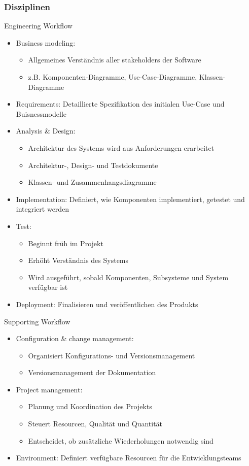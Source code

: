 \subsubsection{Disziplinen}
Engineering Workflow
\begin{itemize}
	\item Business modeling:
		\begin{itemize}
			\item Allgemeines Verständnis aller \glqq{}stakeholders\grqq{} der Software
			\item z.B. Komponenten-Diagramme, Use-Case-Diagramme, Klassen-Diagramme
		\end{itemize}
	\item Requirements: Detaillierte Spezifikation des initialen Use-Case und Buisnessmodelle
	\item Analysis \& Design:
		\begin{itemize}
			\item Architektur des Systems wird aus Anforderungen  erarbeitet
			\item Architektur-, Design- und Testdokumente
			\item Klassen- und Zusammenhangsdiagramme
		\end{itemize}
	\item Implementation: Definiert, wie Komponenten implementiert, getestet und integriert werden
	\item Test:
		\begin{itemize}
			\item Beginnt früh im Projekt
			\item Erhöht Verständnis des Systems
			\item Wird ausgeführt, sobald Komponenten, Subsysteme und System verfügbar ist 
		\end{itemize}
	\item Deployment: Finalisieren und veröffentlichen des Produkts
\end{itemize}
Supporting Workflow
\begin{itemize}
	\item Configuration \& change management:
		\begin{itemize}
			\item Organisiert Konfigurations- und Versionsmanagement
			\item Versionsmanagement der Dokumentation
		\end{itemize}
	\item Project management: 
		\begin{itemize}
			\item Planung und Koordination des Projekts
			\item Steuert Resourcen, Qualität und Quantität
			\item Entscheidet, ob zusätzliche Wiederholungen notwendig sind
		\end{itemize}
	\item Environment: Definiert verfügbare Resourcen für die Entwicklungsteams 
\end{itemize}
